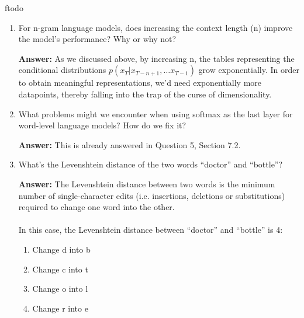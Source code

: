 ƒtodo\documentclass{article}
\newenvironment{QandA}{\begin{enumerate}[label=\arabic*.]}{\end{enumerate}}
\newenvironment{answer}{\par\normalfont \textbf{Answer:}}{}
\newcommand{\g}{\vert}
\begin{document}
\begin{QandA}
    \item For n-gram language models, does increasing the context length (n) improve the model’s performance? Why or why not?
    \begin{answer}
        As we discussed above, by increasing n, the tables representing the conditional distributions $p(x_T \g x_{T-n+1}, \ldots x_{T-1})$ grow exponentially. In order to obtain meaningful representations, we'd need exponentially more datapoints, thereby falling into the trap of the curse of dimensionality.
    \end{answer}

    \item What problems might we encounter when using softmax as the last layer for word-level language models? How do we fix it?
    \begin{answer}
        This is already answered in Question 5, Section 7.2.
    \end{answer}

    \item What's the Levenshtein distance of the two words ``doctor'' and ``bottle''?
    \begin{answer}
         The Levenshtein distance between two words is the minimum number of single-character edits (i.e. insertions, deletions or substitutions) required to change one word into the other.\\\\
         In this case, the Levenshtein distance between ``doctor'' and ``bottle'' is 4:
         \begin{enumerate}[label=\arabic*.]
             \item Change d into b 
             \item Change c into t
             \item Change o into l
             \item Change r into e
         \end{enumerate}
    \end{answer}


\end{QandA}
\end{document}
